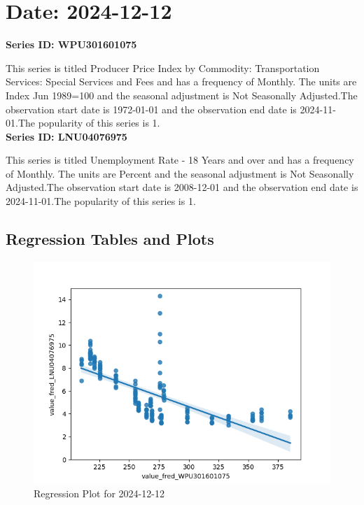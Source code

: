 \section{Date: 2024-12-12}
\noindent \textbf{Series ID: WPU301601075} 

\noindent This series is titled Producer Price Index by Commodity: Transportation Services: Special Services and Fees and has a frequency of Monthly. The units are Index Jun 1989=100 and the seasonal adjustment is Not Seasonally Adjusted.The observation start date is 1972-01-01 and the observation end date is 2024-11-01.The popularity of this series is 1. \\ 

\noindent \textbf{Series ID: LNU04076975} 

\noindent This series is titled Unemployment Rate - 18 Years and over and has a frequency of Monthly. The units are Percent and the seasonal adjustment is Not Seasonally Adjusted.The observation start date is 2008-12-01 and the observation end date is 2024-11-01.The popularity of this series is 1. \\ 

\subsection{Regression Tables and Plots}


\begin{figure}
\centering
\includegraphics[scale = 0.9]{plots/plot_2024-12-12.png}
\caption{Regression Plot for 2024-12-12}
\end{figure}
\newpage
